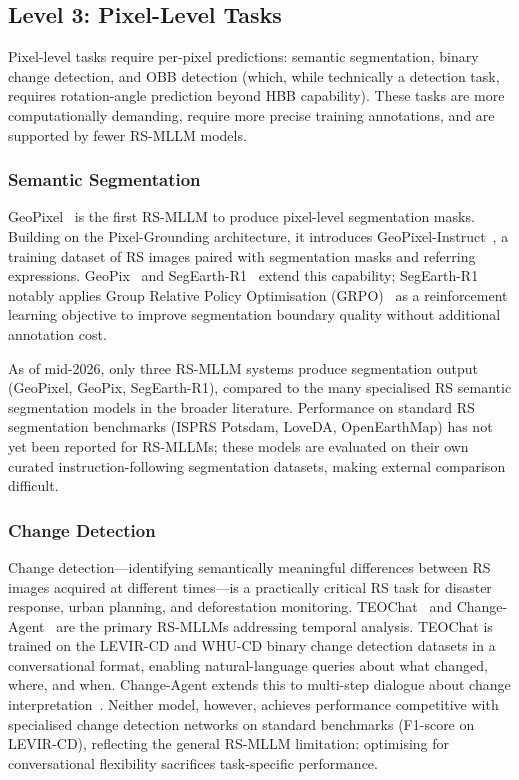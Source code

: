 \subsection{Level 3: Pixel-Level Tasks}\label{sec4:pixel}

Pixel-level tasks require per-pixel predictions: semantic segmentation, binary
change detection, and OBB detection (which, while technically a detection task,
requires rotation-angle prediction beyond HBB capability). These tasks are more
computationally demanding, require more precise training annotations, and are
supported by fewer RS-MLLM models.

\subsubsection{Semantic Segmentation}\label{sec4:seg}

GeoPixel~\cite{geopixel2025} is the first RS-MLLM to produce pixel-level
segmentation masks. Building on the Pixel-Grounding architecture, it introduces
GeoPixel-Instruct~\cite{geopixelinstruct2025}, a training dataset of RS images
paired with segmentation masks and referring expressions. GeoPix~\cite{geopix2025}
and SegEarth-R1~\cite{segearth2026} extend this capability; SegEarth-R1 notably
applies Group Relative Policy Optimisation (GRPO)~\cite{segearth2026} as a
reinforcement learning objective to improve segmentation boundary quality without
additional annotation cost.

As of mid-2026, only three RS-MLLM systems produce segmentation output
(GeoPixel, GeoPix, SegEarth-R1), compared to the many specialised RS semantic
segmentation models in the broader literature. Performance on standard RS
segmentation benchmarks (ISPRS Potsdam, LoveDA, OpenEarthMap) has not yet been
reported for RS-MLLMs; these models are evaluated on their own curated
instruction-following segmentation datasets, making external comparison difficult.

\subsubsection{Change Detection}\label{sec4:cd}

Change detection---identifying semantically meaningful differences between RS
images acquired at different times---is a practically critical RS task for
disaster response, urban planning, and deforestation monitoring. TEOChat~\cite{teochat2025}
and Change-Agent~\cite{changeagent2025} are the primary RS-MLLMs addressing
temporal analysis. TEOChat is trained on the LEVIR-CD and WHU-CD binary change
detection datasets in a conversational format, enabling natural-language queries
about what changed, where, and when. Change-Agent extends this to multi-step
dialogue about change interpretation~\cite{teochat2025b}. Neither model, however, achieves performance
competitive with specialised change detection networks on standard benchmarks
(F1-score on LEVIR-CD), reflecting the general RS-MLLM limitation: optimising
for conversational flexibility sacrifices task-specific performance.

